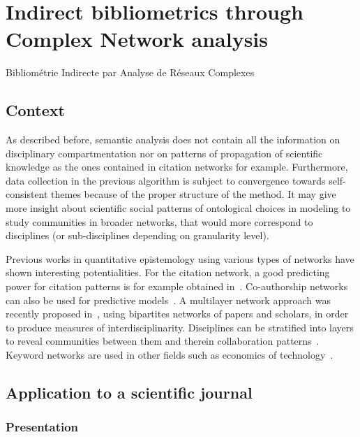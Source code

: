 \newpage


\section{Indirect bibliometrics through Complex Network analysis}{Bibliométrie Indirecte par Analyse de Réseaux Complexes}

\subsection{Context}

As described before, semantic analysis does not contain all the information on disciplinary compartmentation nor on patterns of propagation of scientific knowledge as the ones contained in citation networks for example. Furthermore, data collection in the previous algorithm is subject to convergence towards self-consistent themes because of the proper structure of the method. It may give more insight about scientific social patterns of ontological choices in modeling to study communities in broader networks, that would more correspond to disciplines (or sub-disciplines depending on granularity level).



Previous works in quantitative epistemology using various types of networks have shown interesting potentialities. For the citation network, a good predicting power for citation patterns is for example obtained in~\cite{2013arXiv1310.8220N}. Co-authorship networks can also be used for predictive models~\cite{2014arXiv1402.7268S}. A multilayer network approach was recently proposed in~\cite{2016arXiv160106075O}, using bipartites networks of papers and scholars, in order to produce measures of interdisciplinarity. Disciplines can be stratified into layers to reveal communities between them and therein collaboration patterns~\cite{2015arXiv150601280B}. Keyword networks are used in other fields such as economics of technology~\cite{choi2014patent,shibata2008detecting}.


\subsection{Application to a scientific journal}

\subsubsection{Presentation}

